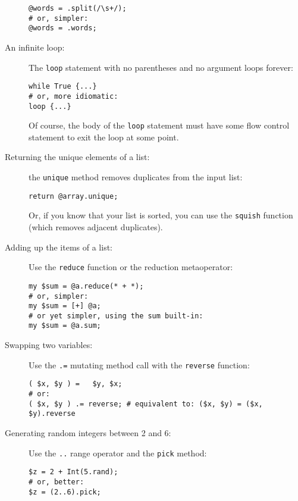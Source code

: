 \begin{description}
\begin{verbatim}
@words = .split(/\s+/);
# or, simpler:
@words = .words;
\end{verbatim}

\item[An infinite loop:] The {\tt loop} statement with no parentheses 
and no argument loops forever: 

\begin{verbatim}
while True {...}
# or, more idiomatic:
loop {...}   
\end{verbatim}

Of course, the body of the {\tt loop} statement must have some 
flow control statement to exit the loop at some point.

\item[Returning the unique elements of a list:] the {\tt unique} 
method removes duplicates from the input list:

\begin{verbatim}
return @array.unique;
\end{verbatim}

Or, if you know that your list is sorted, you can use the 
{\tt squish} function (which removes adjacent duplicates).

\item[Adding up the items of a list:] Use the {\tt reduce} 
function or the reduction metaoperator:

\begin{verbatim}
my $sum = @a.reduce(* + *);
# or, simpler:
my $sum = [+] @a;
# or yet simpler, using the sum built-in:
my $sum = @a.sum;  
\end{verbatim}

\item[Swapping two variables:] Use the \verb'.=' mutating 
method call with the \verb'reverse' function:
\begin{verbatim}
( $x, $y ) =   $y, $x;
# or:
( $x, $y ) .= reverse; # equivalent to: ($x, $y) = ($x, $y).reverse
\end{verbatim}

\item[Generating random integers between 2 and 6:] Use the \verb'..' 
range operator and the {\tt pick} method:
\begin{verbatim}
$z = 2 + Int(5.rand);
# or, better:
$z = (2..6).pick;
\end{verbatim}


\end{description}
